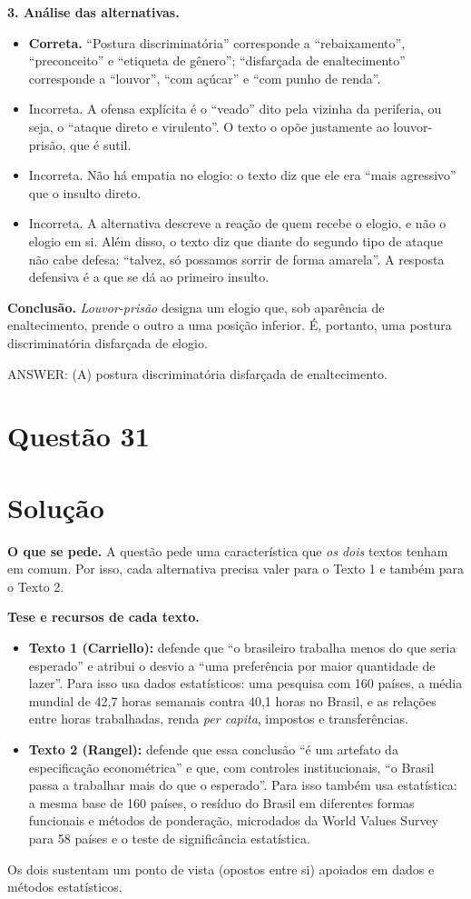 \documentclass{article}%
\begin{document}
\textbf{3. Análise das alternativas.}
\begin{itemize}
  \item[a)] \textbf{Correta.} ``Postura discriminatória'' corresponde a ``rebaixamento'', ``preconceito'' e ``etiqueta de gênero''; ``disfarçada de enaltecimento'' corresponde a ``louvor'', ``com açúcar'' e ``com punho de renda''.
  \item[b)] Incorreta. A ofensa explícita é o ``veado'' dito pela vizinha da periferia, ou seja, o ``ataque direto e virulento''. O texto o opõe justamente ao louvor-prisão, que é sutil.
  \item[c)] Incorreta. Não há empatia no elogio: o texto diz que ele era ``mais agressivo'' que o insulto direto.
  \item[d)] Incorreta. A alternativa descreve a reação de quem recebe o elogio, e não o elogio em si. Além disso, o texto diz que diante do segundo tipo de ataque não cabe defesa: ``talvez, só possamos sorrir de forma amarela''. A resposta defensiva é a que se dá ao primeiro insulto.
\end{itemize}

\textbf{Conclusão.} \emph{Louvor-prisão} designa um elogio que, sob aparência de enaltecimento, prende o outro a uma posição inferior. É, portanto, uma postura discriminatória disfarçada de elogio.

ANSWER: (A) postura discriminatória disfarçada de enaltecimento.%
\newpage%
\section*{Questão 31}

\section*{Solução}

\textbf{O que se pede.} A questão pede uma característica que \emph{os dois} textos tenham em comum. Por isso, cada alternativa precisa valer para o Texto 1 e também para o Texto 2.

\textbf{Tese e recursos de cada texto.}
\begin{itemize}
  \item \textbf{Texto 1 (Carriello):} defende que ``o brasileiro trabalha menos do que seria esperado'' e atribui o desvio a ``uma preferência por maior quantidade de lazer''. Para isso usa dados estatísticos: uma pesquisa com 160 países, a média mundial de 42,7 horas semanais contra 40,1 horas no Brasil, e as relações entre horas trabalhadas, renda \emph{per capita}, impostos e transferências.
  \item \textbf{Texto 2 (Rangel):} defende que essa conclusão ``é um artefato da especificação econométrica'' e que, com controles institucionais, ``o Brasil passa a trabalhar mais do que o esperado''. Para isso também usa estatística: a mesma base de 160 países, o resíduo do Brasil em diferentes formas funcionais e métodos de ponderação, microdados da World Values Survey para 58 países e o teste de significância estatística.
\end{itemize}
Os dois sustentam um ponto de vista (opostos entre si) apoiados em dados e métodos estatísticos.
\end{document}
